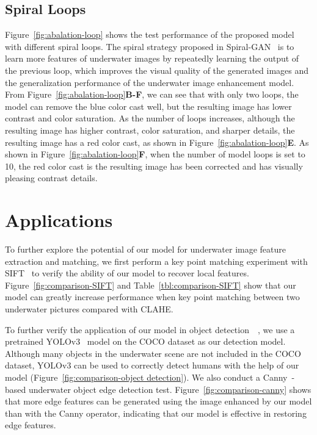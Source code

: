 \documentclass[utf8]{FrontiersinHarvard} %
\begin{document}
\subsection{Spiral Loops}
Figure~\ref{fig:abalation-loop} shows the test performance of the proposed model with different spiral loops. The spiral strategy proposed in Spiral-GAN~\citep{2020Underwater} is to learn more features of underwater images by repeatedly learning the output of the previous loop, which improves the visual quality of the generated images and the generalization performance of the underwater image enhancement model. From Figure~\ref{fig:abalation-loop}\textbf{B-F}, we can see that with only two loops, the model can remove the blue color cast well, but the resulting image has lower contrast and color saturation. As the number of loops increases, although the resulting image has higher contrast, color saturation, and sharper details, the resulting image has a red color cast, as shown in Figure~\ref{fig:abalation-loop}\textbf{E}. As shown in Figure~\ref{fig:abalation-loop}\textbf{F}, when the number of model loops is set to 10, the red color cast is the resulting image has been corrected and has visually pleasing contrast details. 

\section{Applications}
To further explore the potential of our model for underwater image feature extraction and matching, we first perform a key point matching experiment with SIFT~\citep{lowe2004distinctive} to verify the ability of our model to recover local features. Figure~\ref{fig:comparison-SIFT} and Table~\ref{tbl:comparison-SIFT} show that our model can greatly increase performance when key point matching between two underwater pictures compared with CLAHE.

To further verify the application of our model in object detection~\citep{zhu2021cpm}~\citep{bhogale2020data}, we use a pretrained YOLOv3~\citep{2018YOLOv3} model on the COCO dataset as our detection model. Although many objects in the underwater scene are not included in the COCO dataset, YOLOv3 can be used to correctly detect humans with the help of our model (Figure~\ref{fig:comparison-object detection}). We also conduct a Canny~\citep{4767851}-based underwater object edge detection test. Figure~\ref{fig:comparison-canny} shows that more edge features can be generated using the image enhanced by our model than with the Canny operator, indicating that our model is effective in restoring edge features.
\end{document}
